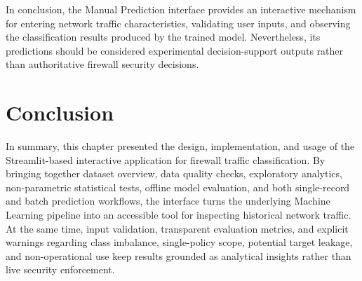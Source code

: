 In conclusion, the Manual Prediction interface provides an interactive mechanism for entering network traffic characteristics, validating user inputs, and observing the classification results produced by the trained model. Nevertheless, its predictions should be considered experimental decision-support outputs rather than authoritative firewall security decisions.

\section{Conclusion}
In summary, this chapter presented the design, implementation, and usage of the Streamlit-based interactive application for firewall traffic classification. By bringing together dataset overview, data quality checks, exploratory analytics, non-parametric statistical tests, offline model evaluation, and both single-record and batch prediction workflows, the interface turns the underlying Machine Learning pipeline into an accessible tool for inspecting historical network traffic. At the same time, input validation, transparent evaluation metrics, and explicit warnings regarding class imbalance, single-policy scope, potential target leakage, and non-operational use keep results grounded as analytical insights rather than live security enforcement.